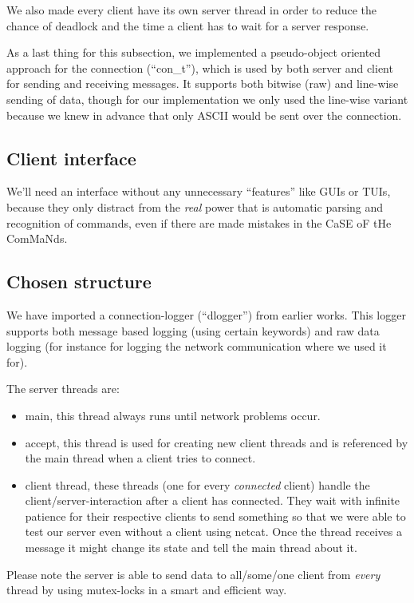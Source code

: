 \documentclass[a4paper]{article}
\begin{document}
We also made every client have its own server thread in order to reduce the
chance of deadlock and the time a client has to wait for a server response.

As a last thing for this subsection, we implemented a pseudo-object oriented
approach for the connection (``con\_t''), which is used by both server and
client for sending and receiving messages. It supports both bitwise (raw) and
line-wise sending of data, though for our implementation we only used the
line-wise variant because we knew in advance that only ASCII would be sent over
the connection.
\subsection{Client interface}
We'll need an interface without any unnecessary ``features'' like GUIs or TUIs,
because they only distract from the \emph{real} power that is automatic parsing
and recognition of commands, even if there are made mistakes in the CaSE oF tHe
ComMaNds.

\subsection{Chosen structure}
We have imported a connection-logger (``dlogger'') from earlier works. This
logger supports both message based logging (using certain keywords) and raw
data logging (for instance for logging the network communication where we used
it for).

The server threads are:
\begin{itemize}
\item main, this thread always runs until network problems occur.
\item accept, this thread is used for creating new client threads and is
referenced by the main thread when a client tries to connect.
\item client thread, these threads (one for every \emph{connected} client)
handle the client/server-interaction after a client has connected. They wait
with infinite patience for their respective clients to send something so that
we were able to test our server even without a client using netcat. Once the
thread receives a message it might change its state and tell the main thread
about it.
\end{itemize}

Please note the server is able to send data to all/some/one client from
\emph{every} thread by using mutex-locks in a smart and efficient way.
\end{document}
